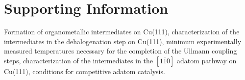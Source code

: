 \documentclass[aps,prb,amsmath,amssymb,11pt]{revtex4-1}
\newcommand{\sinfo}{Supporting Information}
\begin{document}


\section*{\sinfo}

Formation of organometallic intermediates on Cu(111), characterization of the intermediates in the dehalogenation step on Cu(111), minimum experimentally measured temperatures necessary for the completion of the Ullmann coupling steps, characterization of the intermediates in the $[1\bar{1}0]$ adatom pathway on Cu(111), conditions for competitive adatom catalysis.



%
%


\end{document}
